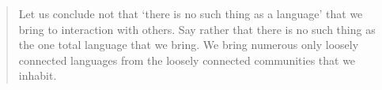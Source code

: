 \begin{quote}
Let us conclude not that ‘there is no such thing as a language’ that we bring to interaction with others. Say rather that there is no such thing as the one total language that we bring. We bring numerous only loosely connected languages from the loosely connected communities that we inhabit. 
\end{quote}
